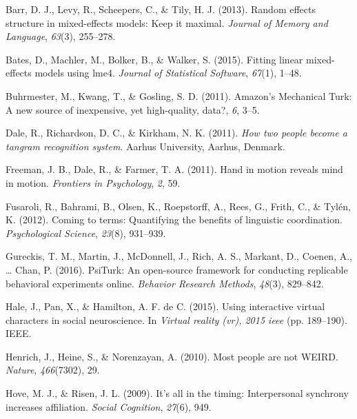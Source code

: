 \documentclass[10pt, letterpaper]{article}
\begin{document}
\setlength{\parindent}{-0.1in} \setlength{\leftskip}{0.125in} \noindent

\hypertarget{refs}{}
\hypertarget{ref-barr2013random}{}
Barr, D. J., Levy, R., Scheepers, C., \& Tily, H. J. (2013). Random
effects structure in mixed-effects models: Keep it maximal.
\emph{Journal of Memory and Language}, \emph{63}(3), 255--278.

\hypertarget{ref-bates2015fitting}{}
Bates, D., Machler, M., Bolker, B., \& Walker, S. (2015). Fitting linear
mixed-effects models using lme4. \emph{Journal of Statistical Software},
\emph{67}(1), 1--48.

\hypertarget{ref-buhrmester2011amazon}{}
Buhrmester, M., Kwang, T., \& Gosling, S. D. (2011). Amazon's Mechanical
Turk: A new source of inexpensive, yet high-quality, data?, \emph{6},
3--5.

\hypertarget{ref-dale2011how}{}
Dale, R., Richardson, D. C., \& Kirkham, N. K. (2011). \emph{How two
people become a tangram recognition system}. Aarhus University, Aarhus,
Denmark.

\hypertarget{ref-freeman2011hand}{}
Freeman, J. B., Dale, R., \& Farmer, T. A. (2011). Hand in motion
reveals mind in motion. \emph{Frontiers in Psychology}, \emph{2}, 59.

\hypertarget{ref-fusaroli2012coming}{}
Fusaroli, R., Bahrami, B., Olsen, K., Roepstorff, A., Rees, G., Frith,
C., \& Tylén, K. (2012). Coming to terms: Quantifying the benefits of
linguistic coordination. \emph{Psychological Science}, \emph{23}(8),
931--939.

\hypertarget{ref-gureckis2016psiturk}{}
Gureckis, T. M., Martin, J., McDonnell, J., Rich, A. S., Markant, D.,
Coenen, A., \ldots{} Chan, P. (2016). PsiTurk: An open-source framework
for conducting replicable behavioral experiments online. \emph{Behavior
Research Methods}, \emph{48}(3), 829--842.

\hypertarget{ref-hale2015using}{}
Hale, J., Pan, X., \& Hamilton, A. F. de C. (2015). Using interactive
virtual characters in social neuroscience. In \emph{Virtual reality
(vr), 2015 ieee} (pp. 189--190). IEEE.

\hypertarget{ref-henrich2010most}{}
Henrich, J., Heine, S., \& Norenzayan, A. (2010). Most people are not
WEIRD. \emph{Nature}, \emph{466}(7302), 29.

\hypertarget{ref-hove2009s}{}
Hove, M. J., \& Risen, J. L. (2009). It's all in the timing:
Interpersonal synchrony increases affiliation. \emph{Social Cognition},
\emph{27}(6), 949.
\end{document}
